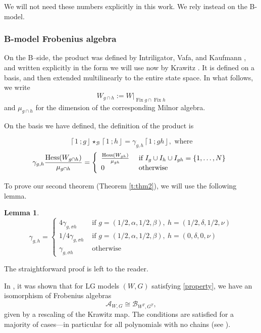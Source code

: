 \documentclass[10pt, letterpaper]{amsart}
\newtheorem{lem}[thm]{Lemma}
\theoremstyle{remark}
\newcommand{\sA}{\mathscr{A}}
\newcommand{\sB}{\mathscr{B}}
\newcommand{\fjrw}[2]{ \left\lceil #1 \:; #2 \right\rfloor }
\DeclareMathOperator{\Hess}{Hess}
\DeclareMathOperator{\Fix}{Fix}
\begin{document}
We will not need these numbers explicitly in this work. We rely instead on the B-model. 


\subsubsection{B-model Frobenius algebra}
On the B--side, the product was defined by Intriligator, Vafa, and Kaufmann \cite{IV, kau1,kau2,kau3}, and written explicitly in the form we will use now by Krawitz \cite{Kr}. It is defined on a basis, and then extended multilinearly to the entire state space. In what follows, we write 
\[
W_{g\cap h}:= W|_{\Fix g \cap \Fix h}
\]
and $\mu_{g\cap h}$ for the dimension of the corresponding Milnor algebra. 

On the basis we have defined, the definition of the product is 

\[
\fjrw{1}{g}\star_{\sB} \fjrw{1}{h} = \gamma_{g,h} \fjrw{1}{gh}, \text{ where}
\]
\[
\gamma_{g,h} \frac{\Hess (W_{g\cap h})}{\mu_{g\cap h}} = \left\{ \begin{array}{l l }
\frac{\Hess (W_{gh})}{\mu_{gh}} & \text{ if } I_g \cup I_h \cup I_{gh} = \{1, \ldots, N\}\\
0 & \text{ otherwise} \\ \end{array}\right.
\]

To prove our second theorem (Theorem \ref{t:thm2}), we will use the following lemma. 

\begin{lem}\label{lem:gamma_relations}
\[
\gamma_{g,h} = \left\{ 
\begin{array}{ll}
4 \gamma_{g, \sigma h} & \text{ if } g = (1/2, \alpha, 1/2, \beta),\ h = (1/2, \delta, 1/2, \nu)\\
1/4 \gamma_{g, \sigma h} & \text{ if } g = (1/2, \alpha, 1/2, \beta),\ h = (0, \delta, 0, \nu)\\
 \gamma_{g, \sigma h} & \text{ otherwise} \end{array}\right.
\]
\end{lem}
The straightforward proof is left to the reader. 

In \cite{FJJS}, it was shown that for LG models $(W,G)$ satisfying \autoref{property}, we have an isomorphism of Frobenius algebras
\[
\sA_{W,G}\cong \sB_{W^T,G^T}, 
\]
given by a rescaling of the Krawitz map. 
The conditions are satisfied for a majority of cases---in particular for all polynomials with no chains (see \cite[Remark 1.1.1]{FJJS}).  
\end{document}
